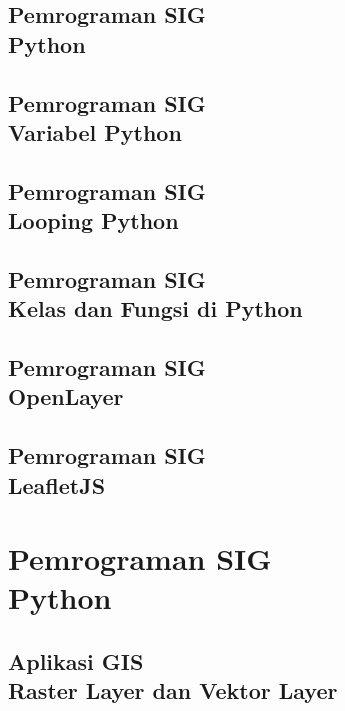 \documentclass{WileySix}
\begin{document}
\chapter[Python]
{Pemrograman SIG\\ Python}


\chapter[Variabel]
{Pemrograman SIG\\ Variabel Python}



\chapter[Looping]
{Pemrograman SIG\\ Looping Python}


\chapter[Kelas dan Fungsi di Python]
{Pemrograman SIG\\ Kelas dan Fungsi di Python}


\chapter[OpenLayer]
{Pemrograman SIG\\ OpenLayer}


\chapter[LeafletJS]
{Pemrograman SIG\\ LeafletJS}


\part[Aplikasi SIG]
{Pemrograman SIG\\ Python}



\chapter[Raster Layer dan Vektor Layer]
{Aplikasi GIS\\ Raster Layer dan Vektor Layer}

\end{document}
